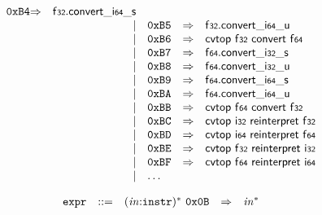 $$\begin{array}{@{}l@{}rrlll@{}l@{}}
\mathtt{0xB4} &\Rightarrow& \mathsf{f{\scriptstyle32}} . {{{{\mathsf{convert}}{\mathsf{\_}}}{\mathsf{i{\scriptstyle64}}}}{\mathsf{\_}}}{\mathsf{s}} \\ &&|&
\mathtt{0xB5} &\Rightarrow& \mathsf{f{\scriptstyle32}} . {{{{\mathsf{convert}}{\mathsf{\_}}}{\mathsf{i{\scriptstyle64}}}}{\mathsf{\_}}}{\mathsf{u}} \\ &&|&
\mathtt{0xB6} &\Rightarrow& \mathsf{cvtop}~\mathsf{f{\scriptstyle32}}~\mathsf{convert}~\mathsf{f{\scriptstyle64}} \\ &&|&
\mathtt{0xB7} &\Rightarrow& \mathsf{f{\scriptstyle64}} . {{{{\mathsf{convert}}{\mathsf{\_}}}{\mathsf{i{\scriptstyle32}}}}{\mathsf{\_}}}{\mathsf{s}} \\ &&|&
\mathtt{0xB8} &\Rightarrow& \mathsf{f{\scriptstyle64}} . {{{{\mathsf{convert}}{\mathsf{\_}}}{\mathsf{i{\scriptstyle32}}}}{\mathsf{\_}}}{\mathsf{u}} \\ &&|&
\mathtt{0xB9} &\Rightarrow& \mathsf{f{\scriptstyle64}} . {{{{\mathsf{convert}}{\mathsf{\_}}}{\mathsf{i{\scriptstyle64}}}}{\mathsf{\_}}}{\mathsf{s}} \\ &&|&
\mathtt{0xBA} &\Rightarrow& \mathsf{f{\scriptstyle64}} . {{{{\mathsf{convert}}{\mathsf{\_}}}{\mathsf{i{\scriptstyle64}}}}{\mathsf{\_}}}{\mathsf{u}} \\ &&|&
\mathtt{0xBB} &\Rightarrow& \mathsf{cvtop}~\mathsf{f{\scriptstyle64}}~\mathsf{convert}~\mathsf{f{\scriptstyle32}} \\ &&|&
\mathtt{0xBC} &\Rightarrow& \mathsf{cvtop}~\mathsf{i{\scriptstyle32}}~\mathsf{reinterpret}~\mathsf{f{\scriptstyle32}} \\ &&|&
\mathtt{0xBD} &\Rightarrow& \mathsf{cvtop}~\mathsf{i{\scriptstyle64}}~\mathsf{reinterpret}~\mathsf{f{\scriptstyle64}} \\ &&|&
\mathtt{0xBE} &\Rightarrow& \mathsf{cvtop}~\mathsf{f{\scriptstyle32}}~\mathsf{reinterpret}~\mathsf{i{\scriptstyle32}} \\ &&|&
\mathtt{0xBF} &\Rightarrow& \mathsf{cvtop}~\mathsf{f{\scriptstyle64}}~\mathsf{reinterpret}~\mathsf{i{\scriptstyle64}} \\ &&|&
\dots \\
\end{array}
$$

\vspace{1ex}

$$
\begin{array}{@{}l@{}rrlll@{}l@{}}
& {\mathtt{expr}} &::=& {({\mathit{in}}{:}{\mathtt{instr}})^\ast}~\mathtt{0x0B} &\Rightarrow& {{\mathit{in}}^\ast} \\
\end{array}
$$

